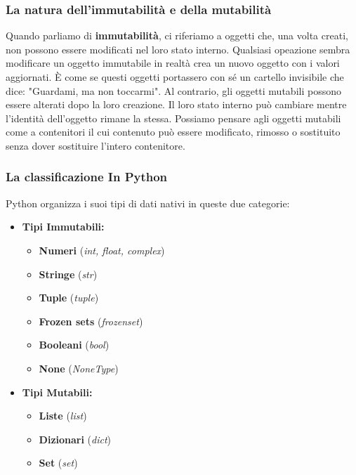     \subsubsection*{La natura dell'immutabilità e della mutabilità}
    Quando parliamo di \textbf{immutabilità}, ci riferiamo a oggetti che, una volta creati, non possono essere modificati nel loro stato interno. Qualsiasi opeazione sembra modificare un oggetto immutabile in realtà crea un nuovo oggetto con i valori aggiornati. È come se questi oggetti portassero con sé un cartello invisibile che dice: "Guardami, ma non toccarmi".
    Al contrario, gli oggetti mutabili possono essere alterati dopo la loro creazione. Il loro stato interno può cambiare mentre l'identità dell'oggetto rimane la stessa. Possiamo pensare agli oggetti mutabili come a contenitori il cui contenuto può essere modificato, rimosso o sostituito senza dover sostituire l'intero contenitore.

    \subsubsection*{La classificazione In Python}
    Python organizza i suoi tipi di dati nativi in queste due categorie:

    \begin{itemize}
        \item \textbf{Tipi Immutabili:}
        \begin{itemize}
            \item \textbf{Numeri} (\textit{int, float, complex})
            \item \textbf{Stringe} (\textit{str})
            \item \textbf{Tuple} (\textit{tuple})
            \item \textbf{Frozen sets} (\textit{frozenset})
            \item \textbf{Booleani} (\textit{bool})
            \item \textbf{None} (\textit{NoneType})
        \end{itemize}
    \end{itemize}

    \begin{itemize}
        \item \textbf{Tipi Mutabili:}
        \begin{itemize}
            \item \textbf{Liste} (\textit{list})
            \item \textbf{Dizionari} (\textit{dict})
            \item \textbf{Set} (\textit{set})
        \end{itemize}
    \end{itemize}

